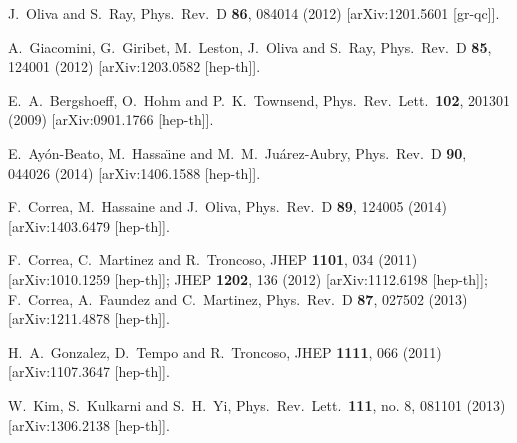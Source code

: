 \documentclass[prd,twocolumn,superscriptaddress,amsmath,amssymb,nofootinbib]{revtex4-1}
\begin{document}
\begin{thebibliography}{99}
  J.~Oliva and S.~Ray,
  Phys.\ Rev.\ D {\bf 86}, 084014 (2012)
  [arXiv:1201.5601 [gr-qc]].

  A.~Giacomini, G.~Giribet, M.~Leston, J.~Oliva and S.~Ray,
  Phys.\ Rev.\ D {\bf 85}, 124001 (2012)
  [arXiv:1203.0582 [hep-th]].

  E.~A.~Bergshoeff, O.~Hohm and P.~K.~Townsend,
  Phys.\ Rev.\ Lett.\  {\bf 102}, 201301 (2009)
  [arXiv:0901.1766 [hep-th]].

  E.~Ay\'{o}n-Beato, M.~Hassa\"{\i}ne and M.~M.~Ju\'{a}rez-Aubry,
  Phys.\ Rev.\ D {\bf 90}, 044026 (2014)
  [arXiv:1406.1588 [hep-th]].

  F.~Correa, M.~Hassaine and J.~Oliva,
  Phys.\ Rev.\ D {\bf 89}, 124005 (2014)
  [arXiv:1403.6479 [hep-th]].

  F.~Correa, C.~Martinez and R.~Troncoso,
  JHEP {\bf 1101}, 034 (2011)
  [arXiv:1010.1259 [hep-th]];
  JHEP {\bf 1202}, 136 (2012)
  [arXiv:1112.6198 [hep-th]];
  F.~Correa, A.~Faundez and C.~Martinez,
  Phys.\ Rev.\ D {\bf 87}, 027502 (2013)
  [arXiv:1211.4878 [hep-th]].

  H.~A.~Gonzalez, D.~Tempo and R.~Troncoso,
  JHEP {\bf 1111}, 066 (2011)
  [arXiv:1107.3647 [hep-th]].

  W.~Kim, S.~Kulkarni and S.~H.~Yi,
  Phys.\ Rev.\ Lett.\  {\bf 111}, no. 8, 081101 (2013)
  [arXiv:1306.2138 [hep-th]].


\end{thebibliography}
\end{document}

